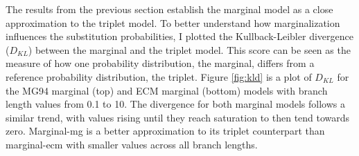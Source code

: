 The results from the previous section establish the marginal model as a close approximation to the triplet model. To better understand how marginalization influences the substitution probabilities, I plotted the Kullback-Leibler divergence ($D_{KL}$) between the marginal and the triplet model. This score can be seen as the measure of how one probability distribution, the marginal, differs from a reference probability distribution, the triplet. Figure \ref{fig:kld} is a plot of $D_{KL}$ for the MG94 marginal (top) and ECM marginal (bottom) models with branch length values from 0.1 to 10. The divergence for both marginal models follows a similar trend, with values rising until they reach saturation to then tend towards zero. Marginal-mg is a better approximation to its triplet counterpart than marginal-ecm with smaller values across all branch lengths.



